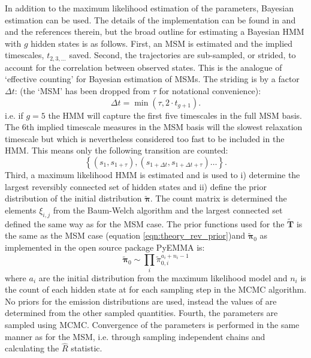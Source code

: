 In addition to the maximum likelihood estimation of the parameters, Bayesian estimation can be used. The details of the implementation can be found in \cite{choderaBayesianHiddenMarkov2011a} and \cite{schererPyEMMASoftwarePackage2015a} and the references therein, but the broad outline for estimating a Bayesian HMM with $g$ hidden states is as follows. First, an MSM is estimated and the implied timescales, $t_{2,3, \ldots}$ saved. Second, the trajectories are sub-sampled, or strided, to account for the correlation between observed states. This is the analogue of `effective counting' for Bayesian estimation of MSMs. The striding is by a factor $\Delta t$: (the `MSM' has been dropped from $\tau$ for notational convenience):
\begin{equation}\label{eqn:hmm_striding}
    \Delta t = \min{\left(\tau, 2\cdot t_{g+1}\right)}. 
\end{equation}
i.e. if $g=5$ the HMM will  capture the first five timescales in the full MSM basis. The $6$th implied timescale measures in the MSM basis will the slowest relaxation timescale but which is nevertheless considered too fast to be included in the HMM. This means only the following transition are counted: 
\begin{equation}
    \left\{(s_{1}, s_{1+\tau}), (s_{1+\Delta t}, s_{1+\Delta t + \tau}) \ldots \right \}.
\end{equation}
Third, a maximum likelihood HMM is estimated and is used to i) determine the largest reversibly connected set of hidden states and ii) define the prior distribution of the initial distribution $\widetilde{\bm{\pi}}$. The count matrix is determined the elements  $\xi_{i,j}$ from the Baum-Welch algorithm and the largest connected set defined the same way as for the MSM case. The prior functions used for the $\widetilde{\mathbf{T}}$ is the same as the MSM case (equation \ref{eqn:theory_rev_prior})and $\widetilde{\bm{\pi}}_{0}$ as implemented in the open source package PyEMMA \cite{schererPyEMMASoftwarePackage2015a} is: 
\begin{equation}
    \widetilde{\bm{\pi}}_{0}  \sim \prod_{i} \widetilde{\pi}_{0, i}^{a_{i}+n_{i}-1} 
\end{equation}
where $a_{i}$ are the initial distribution from the maximum likelihood model and $n_{i}$ is the count of each hidden state at for each sampling step in the MCMC algorithm. No priors for the emission distributions are used, instead the values of are determined from the other sampled quantities. Fourth, the parameters are sampled using MCMC. Convergence of the parameters is performed in the same manner as for the MSM, i.e. through sampling independent chains and calculating the $\hat{R}$ statistic. 

